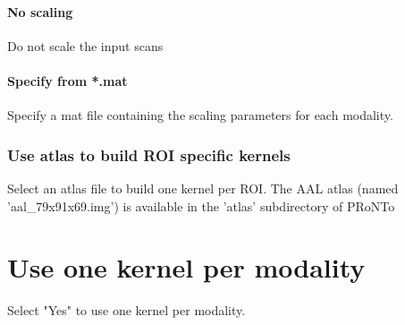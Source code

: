 \paragraph{No scaling}
Do not scale the input scans


\paragraph{Specify from *.mat}
Specify a mat file containing the scaling parameters for each modality.


\subsubsection{Use atlas to build ROI specific kernels}
Select an atlas file to build one kernel per ROI. The AAL atlas (named 'aal\_79x91x69.img') is available in the 'atlas' subdirectory of PRoNTo


\section{Use one kernel per modality}
Select "Yes" to use one kernel per modality.

